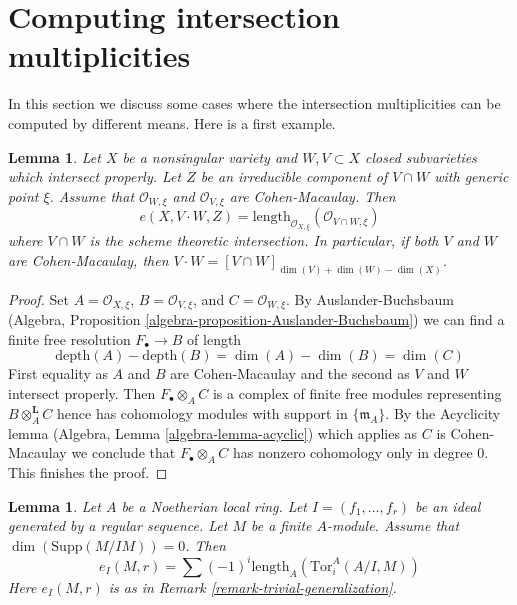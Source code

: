 \documentclass{stacks-project}
\theoremstyle{plain}
\newtheorem{lemma}[subsection]{Lemma}
\theoremstyle{definition}
\theoremstyle{remark}
\numberwithin{equation}{subsection}
\begin{document}
\section{Computing intersection multiplicities}
\label{section-computing-intersection-multiplicities}

\noindent
In this section we discuss some cases where the intersection multiplicities
can be computed by different means. Here is a first example.

\begin{lemma}
\label{lemma-intersection-multiplicity-CM}
Let $X$ be a nonsingular variety and $W, V \subset X$ closed
subvarieties which intersect properly. Let $Z$ be an irreducible component
of $V \cap W$ with generic point $\xi$. Assume that $\mathcal{O}_{W, \xi}$
and $\mathcal{O}_{V, \xi}$ are Cohen-Macaulay. Then
$$
e(X, V \cdot W, Z) =
\text{length}_{\mathcal{O}_{X, \xi}}(\mathcal{O}_{V \cap W, \xi})
$$
where $V \cap W$ is the scheme theoretic intersection.
In particular, if both $V$ and $W$ are Cohen-Macaulay, then
$V \cdot W = [V \cap W]_{\dim(V) + \dim(W) - \dim(X)}$.
\end{lemma}

\begin{proof}
Set $A = \mathcal{O}_{X, \xi}$, $B = \mathcal{O}_{V, \xi}$, and
$C = \mathcal{O}_{W, \xi}$. By Auslander-Buchsbaum
(Algebra, Proposition \ref{algebra-proposition-Auslander-Buchsbaum})
we can find a finite free resolution $F_\bullet \to B$ of
length
$$
\text{depth}(A) - \text{depth}(B) =
\dim(A) - \dim(B) = \dim(C)
$$
First equality as $A$ and $B$ are Cohen-Macaulay and the second
as $V$ and $W$ intersect properly. Then $F_\bullet \otimes_A C$ is a
complex of finite free modules representing $B \otimes_A^\mathbf{L} C$
hence has cohomology modules with support in $\{\mathfrak m_A\}$.
By the Acyclicity lemma (Algebra, Lemma \ref{algebra-lemma-acyclic})
which applies as $C$ is Cohen-Macaulay
we conclude that $F_\bullet \otimes_A C$ has nonzero
cohomology only in degree $0$. This finishes the proof.
\end{proof}

\begin{lemma}
\label{lemma-one-ideal-ci}
Let $A$ be a Noetherian local ring. Let $I = (f_1, \ldots, f_r)$ be an ideal
generated by a regular sequence. Let $M$ be a finite $A$-module. Assume that
$\dim(\text{Supp}(M/IM)) = 0$. Then
$$
e_I(M, r) = \sum (-1)^i\text{length}_A(\text{Tor}_i^A(A/I, M))
$$
Here $e_I(M, r)$ is as in Remark \ref{remark-trivial-generalization}.
\end{lemma}
\end{document}
